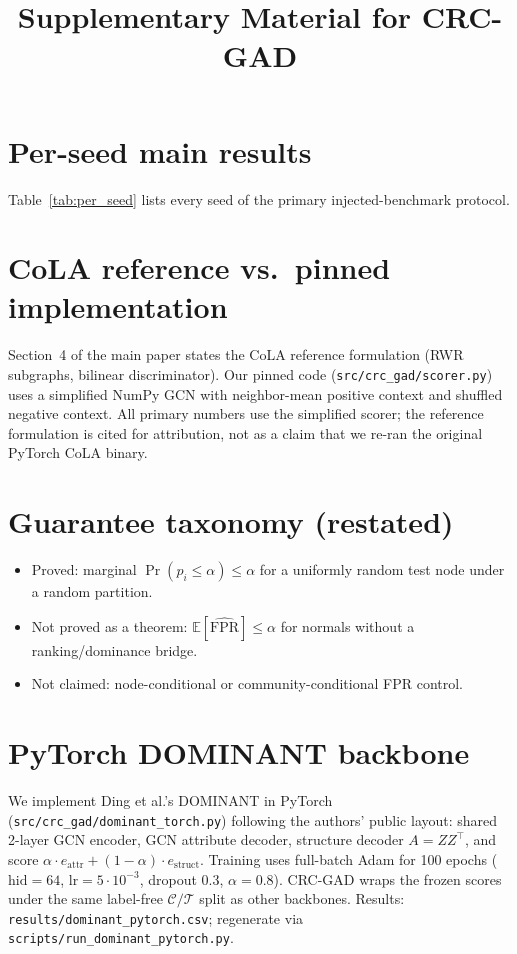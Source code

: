 \documentclass[a4paper,11pt]{article}
\title{Supplementary Material for CRC-GAD}
\author{}
\date{}
\begin{document}
\maketitle

\section{Per-seed main results}
Table~\ref{tab:per_seed} lists every seed of the primary injected-benchmark protocol.

\begin{table}[ht]
\centering
\caption{Per-seed results from \texttt{results/main\_results.csv}.}
\label{tab:per_seed}
\scriptsize

\end{table}

\section{CoLA reference vs.\ pinned implementation}
Section~4 of the main paper states the CoLA reference formulation (RWR subgraphs, bilinear discriminator).
Our pinned code (\texttt{src/crc\_gad/scorer.py}) uses a simplified NumPy GCN with neighbor-mean positive context and shuffled negative context.
All primary numbers use the simplified scorer; the reference formulation is cited for attribution, not as a claim that we re-ran the original PyTorch CoLA binary.

\section{Guarantee taxonomy (restated)}
\begin{itemize}
  \item Proved: marginal $\Pr(p_i\leq\alpha)\leq\alpha$ for a uniformly random test node under a random partition.
  \item Not proved as a theorem: $\mathbb{E}[\widehat{\mathrm{FPR}}]\leq\alpha$ for normals without a ranking/dominance bridge.
  \item Not claimed: node-conditional or community-conditional FPR control.
\end{itemize}

\section{PyTorch DOMINANT backbone}
We implement Ding et al.'s DOMINANT in PyTorch (\texttt{src/crc\_gad/dominant\_torch.py}) following the authors' public layout: shared 2-layer GCN encoder, GCN attribute decoder, structure decoder $A{=}ZZ^\top$, and score $\alpha\cdot e_{\mathrm{attr}}+(1-\alpha)\cdot e_{\mathrm{struct}}$.
Training uses full-batch Adam for 100 epochs ($\mathrm{hid}{=}64$, $\mathrm{lr}{=}5\cdot 10^{-3}$, dropout $0.3$, $\alpha{=}0.8$).
CRC-GAD wraps the frozen scores under the same label-free $\mathcal{C}/\mathcal{T}$ split as other backbones.
Results: \texttt{results/dominant\_pytorch.csv}; regenerate via \texttt{scripts/run\_dominant\_pytorch.py}.
\end{document}
